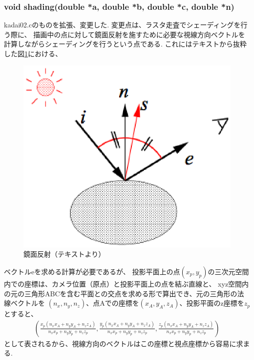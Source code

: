 \documentclass[a4j,dvipdfmx]{jsarticle}
\begin{document}
\subsubsection{void shading(double *a, double *b, double *c, double *n)}
kadai02.cのものを拡張、変更した.
変更点は、ラスタ走査でシェーディングを行う際に、
描画中の点に対して鏡面反射を施すために必要な視線方向ベクトルを計算しながらシェーディングを行うという点である.
これにはテキストから抜粋した図\ref{fig:mirref}における、
\begin{figure}[htbp]
  \begin{center}
    \includegraphics[clip,scale=0.5]{images/mirrorref.eps}
    \caption{鏡面反射（テキストより）}
  \end{center}
  \label{fig:mirref}
\end{figure}
ベクトルeを求める計算が必要であるが、
投影平面上の点$(x_{p}, y_{p})$の三次元空間内での座標は、カメラ位置（原点）と投影平面上の点を結ぶ直線と、
xyz空間内の元の三角形ABCを含む平面との交点を求める形で算出でき、元の三角形の法線ベクトルを
$(n_{x}, n_{y}, n_{z})$、点Aでの座標を$(x_{A}, y_{A}, z_{A})$、投影平面のz座標を$z_{p}$
とすると、
\begin{eqnarray}
(\frac{x_{p}(n_{x}x_{A}+n_{y}y_{A}+n_{z}z_{A})}{n_{x}x_{p} + n_{y}y_{p} + n_{z}z_{p}}, 
\frac{y_{p}(n_{x}x_{A}+n_{y}y_{A}+n_{z}z_{A})}{n_{x}x_{p} + n_{y}y_{p} + n_{z}z_{p}}, 
\frac{z_{p}(n_{x}x_{A}+n_{y}y_{A}+n_{z}z_{A})}{n_{x}x_{p} + n_{y}y_{p} + n_{z}z_{p}})
\end{eqnarray}
として表されるから、視線方向のベクトルはこの座標と視点座標から容易に求まる.
\end{document}
